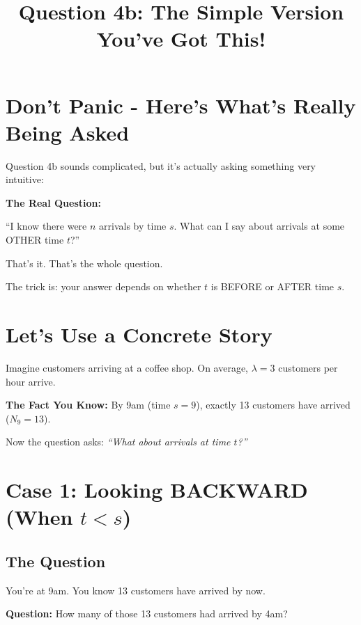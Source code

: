 \documentclass[11pt]{article}
\title{\textbf{Question 4b: The Simple Version} \\ \large You've Got This!}
\author{}
\date{}
\begin{document}
\maketitle

\section{Don't Panic - Here's What's Really Being Asked}

Question 4b sounds complicated, but it's actually asking something very intuitive:

\begin{tcolorbox}[colback=blue!10!white,colframe=blue!75!black]
\textbf{The Real Question:}

``I know there were $n$ arrivals by time $s$. What can I say about arrivals at some OTHER time $t$?''

That's it. That's the whole question.
\end{tcolorbox}

The trick is: your answer depends on whether $t$ is BEFORE or AFTER time $s$.

\section{Let's Use a Concrete Story}

Imagine customers arriving at a coffee shop. On average, $\lambda = 3$ customers per hour arrive.

\vspace{0.3cm}

\textbf{The Fact You Know:} By 9am (time $s = 9$), exactly 13 customers have arrived ($N_9 = 13$).

\vspace{0.3cm}

Now the question asks: \textit{``What about arrivals at time $t$?''}

\section{Case 1: Looking BACKWARD (When $t < s$)}

\subsection{The Question}

You're at 9am. You know 13 customers have arrived by now.

\textbf{Question:} How many of those 13 customers had arrived by 4am?
\end{document}
